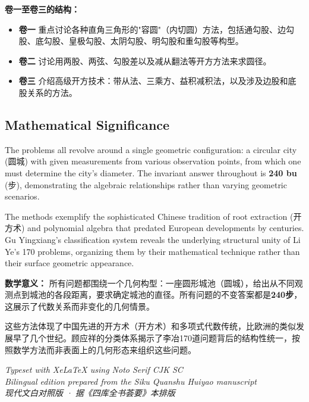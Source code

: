 \documentclass[11pt,a4paper]{article}
\newcounter{problem}[section]
\begin{document}
\textbf{卷一至卷三的结构：}
\begin{itemize}
\item \textbf{卷一} 重点讨论各种直角三角形的"容圆"（内切圆）方法，包括通勾股、边勾股、底勾股、皇极勾股、太阴勾股、明勾股和重勾股等构型。
\item \textbf{卷二} 讨论用两股、两弦、勾股差以及减从翻法等开方方法来求圆径。
\item \textbf{卷三} 介绍高级开方技术：带从法、三乘方、益积减积法，以及涉及边股和底股关系的方法。

\end{itemize}

\subsection*{Mathematical Significance}
The problems all revolve around a single geometric configuration: a circular city (圆城) with given measurements from various observation points, from which one must determine the city's diameter. The invariant answer throughout is \textbf{240 bu} (步), demonstrating the algebraic relationships rather than varying geometric scenarios.

The methods exemplify the sophisticated Chinese tradition of root extraction (开方术) and polynomial algebra that predated European developments by centuries. Gu Yingxiang's classification system reveals the underlying structural unity of Li Ye's 170 problems, organizing them by their mathematical technique rather than their surface geometric appearance.

\textbf{数学意义：}
所有问题都围绕一个几何构型：一座圆形城池（圆城），给出从不同观测点到城池的各段距离，要求确定城池的直径。所有问题的不变答案都是\textbf{240步}，这展示了代数关系而非变化的几何情景。

这些方法体现了中国先进的开方术（开方术）和多项式代数传统，比欧洲的类似发展早了几个世纪。顾应祥的分类体系揭示了李冶170道问题背后的结构性统一，按照数学方法而非表面上的几何形态来组织这些问题。

\vspace{1cm}
\begin{flushright}
\textit{Typeset with XeLaTeX using Noto Serif CJK SC}\\
\textit{Bilingual edition prepared from the Siku Quanshu Huiyao manuscript}\\
\textit{现代文白对照版 · 据《四库全书荟要》本排版}
\end{flushright}
\end{document}
